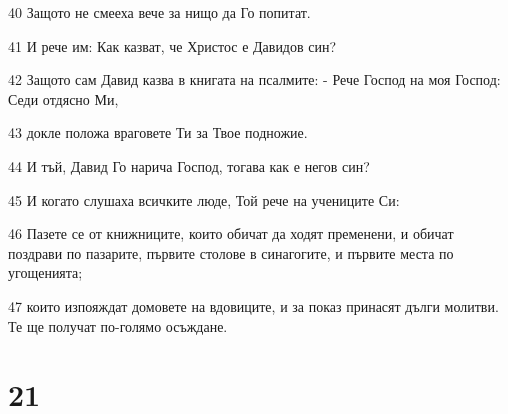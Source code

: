 \par 40 Защото не смееха вече за нищо да Го попитат.
\par 41 И рече им: Как казват, че Христос е Давидов син?
\par 42 Защото сам Давид казва в книгата на псалмите: - Рече Господ на моя Господ: Седи отдясно Ми,
\par 43 докле положа враговете Ти за Твое подножие.
\par 44 И тъй, Давид Го нарича Господ, тогава как е негов син?
\par 45 И когато слушаха всичките люде, Той рече на учениците Си:
\par 46 Пазете се от книжниците, които обичат да ходят пременени, и обичат поздрави по пазарите, първите столове в синагогите, и първите места по угощенията;
\par 47 които изпояждат домовете на вдовиците, и за показ принасят дълги молитви. Те ще получат по-голямо осъждане.

\chapter{21}

